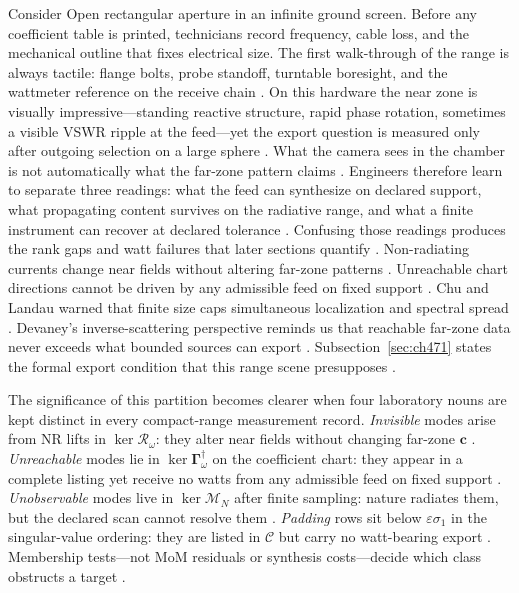 \begin{physicalvignette}
Consider Open rectangular aperture in an infinite ground screen. Before any coefficient table is printed, technicians record frequency, cable loss, and the mechanical outline that fixes electrical size. The first walk-through of the range is always tactile: flange bolts, probe standoff, turntable boresight, and the wattmeter reference on the receive chain \cite{hansen1988}.
On this hardware the near zone is visually impressive---standing reactive structure, rapid phase rotation, sometimes a visible VSWR ripple at the feed---yet the export question is measured only after outgoing selection on a large sphere \cite{harrington2001}. What the camera sees in the chamber is not automatically what the far-zone pattern claims \cite{stratton1941}.
Engineers therefore learn to separate three readings: what the feed can synthesize on declared support, what propagating content survives on the radiative range, and what a finite instrument can recover at declared tolerance \cite{devaney2004}. Confusing those readings produces the rank gaps and watt failures that later sections quantify \cite{pal2026}.
Non-radiating currents change near fields without altering far-zone patterns . Unreachable chart directions cannot be driven by any admissible feed on fixed support .
Chu and Landau warned that finite size caps simultaneous localization and spectral spread \cite{chu1948}. Devaney's inverse-scattering perspective reminds us that reachable far-zone data never exceeds what bounded sources can export \cite{devaney2004}.
Subsection~\ref{sec:ch471} states the formal export condition that this range scene presupposes \cite{stratton1941}.
\end{physicalvignette}
The significance of this partition becomes clearer when four laboratory nouns are kept distinct in every compact-range measurement record. \emph{Invisible} modes arise from NR lifts in $\ker\mathcal{R}_\omega$: they alter near fields without changing far-zone $\mathbf{c}$ \cite{devaney2004}. \emph{Unreachable} modes lie in $\ker\boldsymbol{\Gamma}_\omega^{\dagger}$ on the coefficient chart: they appear in a complete listing yet receive no watts from any admissible feed on fixed support \cite{stratton1941}. \emph{Unobservable} modes live in $\ker\mathcal{M}_N$ after finite sampling: nature radiates them, but the declared scan cannot resolve them \cite{harrington2001}. \emph{Padding} rows sit below $\varepsilon\sigma_{1}$ in the singular-value ordering: they are listed in $\mathcal{C}$ but carry no watt-bearing export \cite{jackson1999}. Membership tests---not MoM residuals or synthesis costs---decide which class obstructs a target \cite{hansen1988}.
